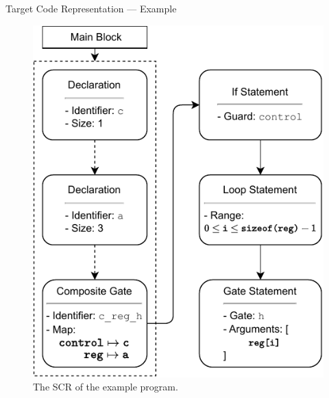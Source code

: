 \begin{frame}{Target Code Representation --- Example}    
    \begin{minipage}{.45\textwidth}
        \centering
        \begin{figure}[htp]
            \centering
            \includegraphics[]{../figures/drawio/codeGen_sourceCode_example.pdf}
            \caption{The SCR of the example program.}
        \end{figure}
    \end{minipage}
    \hfill
    \begin{minipage}{.45\textwidth}
        \centering
        \begin{figure}[htp]
            \centering

\end{figure}
\end{minipage}
\end{frame}
